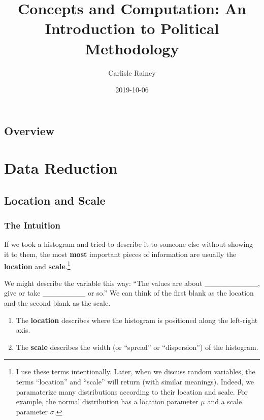 \documentclass[]{book}
\title{Concepts and Computation: An Introduction to Political Methodology}
\author{Carlisle Rainey}
\date{2019-10-06}
\providecommand{\tightlist}{%
  \setlength{\itemsep}{0pt}\setlength{\parskip}{0pt}}
\let\rmarkdownfootnote\footnote%
\def\footnote{\protect\rmarkdownfootnote}
\begin{document}
\maketitle

{
\setcounter{tocdepth}{1}
\tableofcontents
}
\hypertarget{overview}{%
\chapter{Overview}\label{overview}}

\hypertarget{part-data-reduction}{%
\part{Data Reduction}\label{part-data-reduction}}

\hypertarget{location-and-scale}{%
\chapter{Location and Scale}\label{location-and-scale}}

\hypertarget{the-intuition}{%
\section{The Intuition}\label{the-intuition}}

If we took a histogram and tried to describe it to someone else without showing it to them, the most \textbf{most} important pieces of information are usually the \textbf{location} and \textbf{scale}.\footnote{I use these terms intentionally. Later, when we discuss random variables, the terms ``location'' and ``scale'' will return (with similar meanings). Indeed, we paramaterize many distributions according to their location and scale. For example, the normal distribution has a location parameter \(\mu\) and a scale parameter \(\sigma\).}

We might describe the variable this way: ``The values are about \_\_\_\_\_\_\_\_\_\_, give or take \_\_\_\_\_\_\_\_ or so.'' We can think of the first blank as the location and the second blank as the scale.

\begin{enumerate}
\def\labelenumi{\arabic{enumi}.}
\tightlist
\item
  The \textbf{location} describes where the histogram is positioned along the left-right axis.
\item
  The \textbf{scale} describes the width (or ``spread'' or ``dispersion'') of the histogram.
\end{enumerate}
\end{document}
